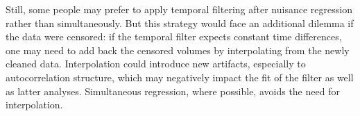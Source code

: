 \documentclass{article}
\begin{document}
Still, some people may prefer to apply temporal filtering after nuisance regression rather than simultaneously. But this strategy would face an additional dilemma if the data were censored: if the temporal filter expects constant time differences, one may need to add back the censored volumes by interpolating from the newly cleaned data. Interpolation could introduce new artifacts, especially to autocorrelation structure, which may negatively impact the fit of the filter as well as latter analyses. Simultaneous regression, where possible, avoids the need for interpolation. 


\end{document}

